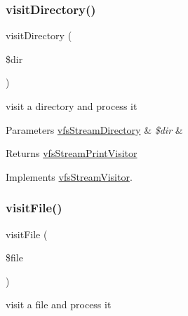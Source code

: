 \subsubsection{\texorpdfstring{visit\+Directory()}{visitDirectory()}}
{\footnotesize\ttfamily visit\+Directory (\begin{DoxyParamCaption}\item[{\mbox{\hyperlink{classorg_1_1bovigo_1_1vfs_1_1vfs_stream_directory}{vfs\+Stream\+Directory}}}]{\$dir }\end{DoxyParamCaption})}

visit a directory and process it


\begin{DoxyParams}[1]{Parameters}
\mbox{\hyperlink{classorg_1_1bovigo_1_1vfs_1_1vfs_stream_directory}{vfs\+Stream\+Directory}} & {\em \$dir} & \\
\hline
\end{DoxyParams}
\begin{DoxyReturn}{Returns}
\mbox{\hyperlink{classorg_1_1bovigo_1_1vfs_1_1visitor_1_1vfs_stream_print_visitor}{vfs\+Stream\+Print\+Visitor}} 
\end{DoxyReturn}


Implements \mbox{\hyperlink{interfaceorg_1_1bovigo_1_1vfs_1_1visitor_1_1vfs_stream_visitor_a58aba2b3abdff052e38254bba19aac72}{vfs\+Stream\+Visitor}}.

\mbox{\label{classorg_1_1bovigo_1_1vfs_1_1visitor_1_1vfs_stream_print_visitor_aefbf1a8429cc874e03034c19eeba5a07}} 
\subsubsection{\texorpdfstring{visit\+File()}{visitFile()}}
{\footnotesize\ttfamily visit\+File (\begin{DoxyParamCaption}\item[{\mbox{\hyperlink{classorg_1_1bovigo_1_1vfs_1_1vfs_stream_file}{vfs\+Stream\+File}}}]{\$file }\end{DoxyParamCaption})}

visit a file and process it


